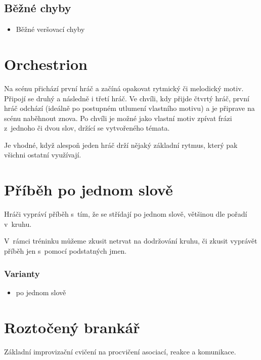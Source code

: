 \subsection{ Běžné chyby } \begin{itemize}
\item  Běžné veršovací chyby
\end{itemize}
 
 
 
 
\needspace{5cm} \section{Orchestrion} \label{orchestrion} Na scénu přichází první hráč a začíná opakovat rytmický či melodický motiv. Připojí se druhý a následně i třetí hráč. Ve chvíli, kdy přijde čtvrtý hráč, první hráč odchází (ideálně po postupném utlumení vlastního motivu) a je připrave na scénu naběhnout znova. 
Po chvíli je možné jako vlastní motiv zpívat frázi z~jednoho či dvou slov, držící se vytvořeného témata. 
 
Je vhodné, když alespoň jeden hráč drží nějaký základní rytmus, který pak všichni ostatní využívají. 
 
 
 
 
\needspace{5cm} \section{Příběh po jednom slově} \label{příběh po jednom slově} Hráči vypráví příběh s~tím, že se střídají po jednom slově, většinou dle pořadí v~kruhu. 
 
V~rámci tréninku můžeme zkusit netrvat na dodržování kruhu, či zkusit vyprávět příběh jen s~pomocí podstatných jmen.  
 
 
\subsubsection{Varianty} \begin{itemize}
\item {}  po jednom slově
\end{itemize}
 
 
 
\needspace{5cm} \section{Roztočený brankář} \label{roztočený brankář} Základní improvizační cvičení na procvičení asociací, reakce a komunikace. 
 
